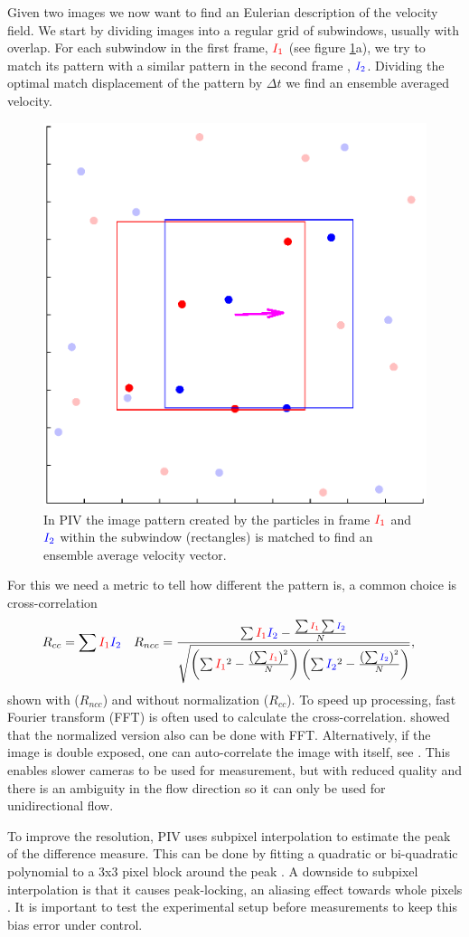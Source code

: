 \documentclass[10pt]{article}
\newcommand{\fb}[0]{\ensuremath{{\color{red}I_1}}}
\newcommand{\fc}[0]{\ensuremath{{\color{blue}I_2}}}
\begin{document}
Given two images we now want to find an Eulerian description of the velocity field.
We start by dividing images into a regular grid of subwindows, usually with overlap.
%
For each subwindow in the first frame, $\fb$ (see figure \ref{pivptv}a),
we try to match its pattern with a similar pattern in the second frame , $\fc$.
Dividing the optimal match displacement of the pattern by $\Delta t$ we find an ensemble averaged velocity.
%
\begin{figure}[htp]
   \centering  
  \includegraphics[width=.45\textwidth]{pivoverview20140620}
   \caption{%
   In PIV the image pattern created by the particles in frame $\fb$ and $\fc$ within the subwindow (rectangles) 
is matched to find an ensemble average {\color{magenta}velocity vector}.}
   \label{pivptv}
\end{figure}
For this we need a metric to tell how different the pattern is, a common choice
is cross-correlation \citep{Willert1991}
\begin{align}
   R_{cc} &= \sum\fb\fc &
   R_{ncc} &= \frac{\sum\fb\fc - \frac{\sum\fb\sum\fc}{N}}
   {\sqrt{\left(\sum\fb^2 - \frac{\left(\sum \fb\right)^2}{N}\right)\left(\sum\fc^2 - \frac{\left(\sum\fc\right)^2}{N}\right) }},
\end{align}
shown with ($R_{ncc}$) and without normalization ($R_{cc}$). 
To speed up processing, fast Fourier transform (FFT) is often used to calculate the cross-correlation.
\cite{Padfield2012} showed that the normalized version also can be done with FFT.
Alternatively, if the image is double exposed, one can auto-correlate the image with itself, see \cite{Adrian1991}.
This enables slower cameras to be used for measurement, but with reduced quality and
there is an ambiguity in the flow direction so it can only be used for unidirectional flow.

To improve the resolution, PIV uses subpixel interpolation to estimate the peak of the difference measure.
This can be done by fitting a quadratic or bi-quadratic polynomial to a 3x3 pixel block around the peak \citep{Nobach2005,Dalziel2012}.
A downside to subpixel interpolation is that it causes peak-locking, an aliasing effect towards whole pixels \citep{Christensen2004}.
It is important to test the experimental setup before measurements to keep this bias error under control.
\end{document}
